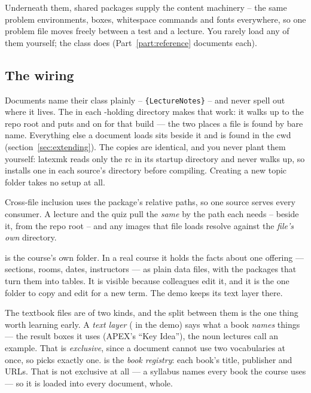 Underneath them, shared packages supply the content machinery -- the same
problem environments, boxes, whitespace commands and fonts everywhere, so
one problem file moves freely between a test and a lecture. You rarely load
any of them yourself; the class does (Part~\ref{part:reference} documents
each).

\subsection{The wiring}

Documents name their class plainly -- \texttt
{\{LectureNotes\}} -- and never spell out where it lives. The
 in each -holding directory makes that work: it
walks up to the repo root and puts  and
 on  for that build --- the
two places a file is found by bare name. Everything else a
document loads sits beside it and is found in the cwd
(section~\ref{sec:extending}). The copies are identical, and you never plant
them yourself: latexmk reads only the rc in its startup directory and never
walks up, so  installs one in each source's directory before
compiling. Creating a new topic folder takes no setup at all.

Cross-file inclusion uses the  package's relative paths, so one
source serves every consumer. A lecture and the quiz pull the \emph{same}
 by the path each needs -- 
beside it,  from the repo root -- and any
images that file loads resolve against the \emph{file's own} directory.

 is the course's own folder.
In a real course it holds the facts about one offering --- sections, rooms, dates, instructors --- as plain data files, with the packages that turn them into tables.
It is visible because colleagues edit it, and it is the one folder to copy and edit for a new term.
The demo keeps its text layer there.

The textbook files are of two kinds, and the split between them is the
one thing worth learning early. A \emph{text layer} (
in the demo) says what a book \emph{names} things --- the result
boxes it uses (APEX's ``Key Idea''), the noun lectures call an example.
That is \emph{exclusive}, since a document cannot use two vocabularies at
once, so  picks exactly one.
 is the \emph{book registry}:
each book's title, publisher and URLs. That is not exclusive at all --- a
syllabus names every book the course uses --- so it is loaded into every
document, whole.

